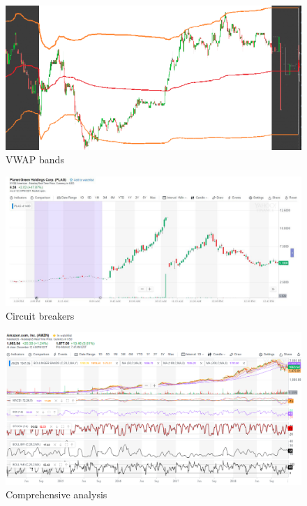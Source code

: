 \documentclass{article}
\begin{document}
\vspace{10pt}

\begin{figure}[!htb]
    \centering
    \includegraphics[width=\textwidth]{imgs/92.png}
    \caption{VWAP bands}
\end{figure}

\vspace{10pt}

\begin{figure}[!htb]
    \centering
    \includegraphics[width=\textwidth]{imgs/93.png}
    \caption{Circuit breakers}
\end{figure}

\vspace{10pt}

\begin{figure}[!htb]
    \centering
    \includegraphics[width=\textwidth]{imgs/94.png}
    \caption{Comprehensive analysis}
\end{figure}
\end{document}
